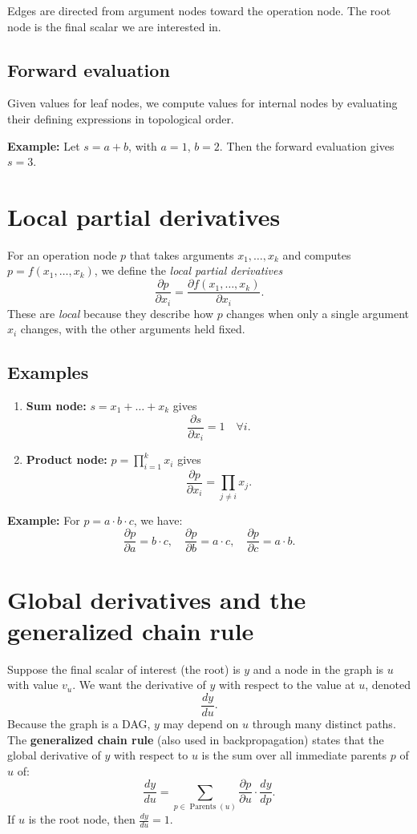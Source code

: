 \documentclass[12pt,a4paper]{article}
\begin{document}
Edges are directed from argument nodes toward the operation node. The root node is the final scalar we are interested in.

\subsection{Forward evaluation}
Given values for leaf nodes, we compute values for internal nodes by evaluating their defining expressions in topological order. 

\textbf{Example:}  
Let $s = a + b$, with $a=1$, $b=2$. Then the forward evaluation gives $s=3$.  

\section{Local partial derivatives}
For an operation node $p$ that takes arguments $x_1,\dots,x_k$ and computes $p=f(x_1,\dots,x_k)$, we define the \emph{local partial derivatives}
\[
\frac{\partial p}{\partial x_i} = \frac{\partial f(x_1,\dots,x_k)}{\partial x_i}.
\]
These are \emph{local} because they describe how $p$ changes when only a single argument $x_i$ changes, with the other arguments held fixed.

\subsection*{Examples}
\begin{enumerate}
    \item \textbf{Sum node:} $s = x_1 + \dots + x_k$ gives 
    \[
    \frac{\partial s}{\partial x_i} = 1 \quad \forall i.
    \]
    \item \textbf{Product node:} $p = \prod_{i=1}^k x_i$ gives
    \[
    \frac{\partial p}{\partial x_i} = \prod_{j\neq i} x_j.
    \]
\end{enumerate}

\textbf{Example:} For $p = a \cdot b \cdot c$, we have:
\[
\frac{\partial p}{\partial a} = b \cdot c, \quad 
\frac{\partial p}{\partial b} = a \cdot c, \quad 
\frac{\partial p}{\partial c} = a \cdot b.
\]

\section{Global derivatives and the generalized chain rule}
Suppose the final scalar of interest (the root) is $y$ and a node in the graph is $u$ with value $v_u$. We want the derivative of $y$ with respect to the value at $u$, denoted
\[
\frac{d y}{d u}.
\]
Because the graph is a DAG, $y$ may depend on $u$ through many distinct paths. The \textbf{generalized chain rule} (also used in backpropagation) states that the global derivative of $y$ with respect to $u$ is the sum over all immediate parents $p$ of $u$ of:
\[
\frac{d y}{d u} = \sum_{p \in \operatorname{Parents}(u)} \frac{\partial p}{\partial u}\cdot \frac{d y}{d p}.
\]
If $u$ is the root node, then $\frac{dy}{du}=1$.
\end{document}
